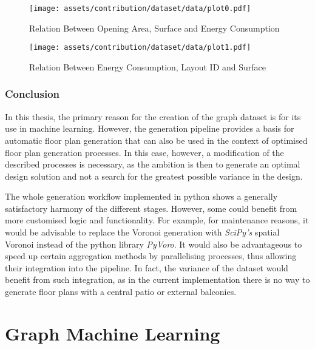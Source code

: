 \documentclass[a4paper, 12pt]{report}
\begin{document}
\begin{figure}
\centering
\texttt{[image: assets/contribution/dataset/data/plot0.pdf]}
\caption{Relation Between Opening Area, Surface and Energy Consumption}
\label{fig:relation-between-opening-area-surface-and-energy-consumption}
\end{figure}

\begin{figure}
\centering
\texttt{[image: assets/contribution/dataset/data/plot1.pdf]}
\caption{Relation Between Energy Consumption, Layout ID and Surface}
\label{fig:relation-between-energy-consumption-layout-id-and-surface}
\end{figure}

\subsection{Conclusion}\label{subsec:conclusion}

In this thesis, the primary reason for the creation of the graph dataset is for its use in machine learning. However, the generation pipeline provides a basis for automatic floor plan generation that can also be used in the context of optimised floor plan generation processes. In this case, however, a modification of the described processes is necessary, as the ambition is then to generate an optimal design solution and not a search for the greatest possible variance in the design.

The whole generation workflow implemented in \Gls{python} shows a generally satisfactory harmony of the different stages. However, some could benefit from more customised logic and functionality. For example, for maintenance reasons, it would be advisable to replace the Voronoi generation with \textit{SciPy's} spatial Voronoi instead of the \Gls{python} library \textit{PyVoro}. It would also be advantageous to speed up certain aggregation methods by parallelising processes, thus allowing their integration into the pipeline. In fact, the variance of the dataset would benefit from such integration, as in the current implementation there is no way to generate floor plans with a central patio or external balconies.

\chapter{Graph Machine Learning}\label{chap:graph-machine-learning}
\end{document}
